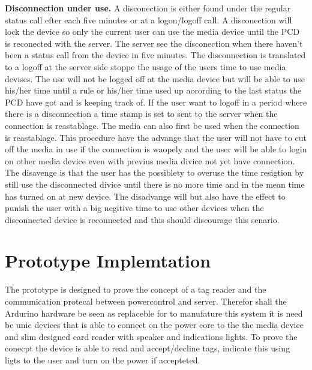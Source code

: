 \textbf{Disconnection under use.} \n
A disconection is either found under the regular status call efter each five minutes or at a logon/logoff call. A disconection will lock the device so only the current user can use the media device until the PCD is reconected with the server. The server see the disconection when there haven't been a status call from the device in five minutes. The disconnection is translated to a logoff at the server side stoppe the usage of the users time to use media devises. The use will not be logged off at the media device but will be able to use his/her time until a rule or his/her time used up according to the last status the PCD have got and is keeping track of. If the user want to logoff in a period where there is a disconnection a time stamp is set to sent to the server when the connection is reastablage. The media can also first be used when the connection is reastablage.   
This procedure have the advange that the user will not have to cut off the media in use if the connection is waopely and the user will be able to login on other media device even with previus media divice not yet have connection. 
The disavenge is that the user has the possiblety to overuse the time resigtion by still use the disconnected divice until there is no more time and in the mean time has turned on at new device. 
The disadvange will but also have the effect to punish the user with a big negitive time to use other devices when the disconnected device is reconnected and this should discourage this senario.       
    
		
\section{Prototype Implemtation}
The prototype is designed to prove the concept of a tag reader and the communication protecal between powercontrol and server. Therefor shall the Ardurino hardware be seen as replaceble for to manufature this system it is need be unic devices that is able to connect on the power core to the the media device and slim designed card reader with speaker and indications lights. To prove the conecpt the device is able to read and accept/decline tags, indicate this using ligts to the user and turn on the power if accepteted.   




    